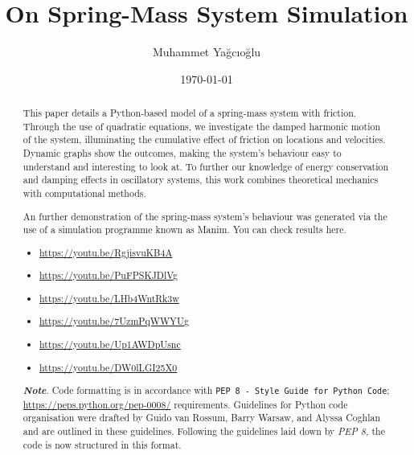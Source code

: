 \documentclass[12pt, a4paper, oneside]{report}
\title{On Spring-Mass System Simulation}
\author{Muhammet Yağcıoğlu}
\date{\today}
\begin{document}
\maketitle

\begin{abstract}
	This paper details a Python-based model of a spring-mass system with friction. Through the use of quadratic equations, we investigate the damped harmonic motion of the system, illuminating the cumulative effect of friction on locations and velocities. Dynamic graphs show the outcomes, making the system's behaviour easy to understand and interesting to look at. To further our knowledge of energy conservation and damping effects in oscillatory systems, this work combines theoretical mechanics with computational methods.

	\vfill
	An further demonstration of the spring-mass system's behaviour was generated via the use of a simulation programme known as Manim. You can check results here.

	\begin{itemize}
		\item \url{https://youtu.be/RgjisvuKB4A}
		\item \url{https://youtu.be/PuFPSKJDlVg}
		\item \url{https://youtu.be/LHb4WntRk3w}
		\item \url{https://youtu.be/7UzmPqWWYUg}
		\item \url{https://youtu.be/Up1AWDpUsnc}
		\item \url{https://youtu.be/DW0lLGI25X0}
	\end{itemize}

	\vfill
	\textbf{\textit{Note}}. Code formatting is in accordance with \texttt{PEP 8 - Style Guide for Python Code}; \url{https://peps.python.org/pep-0008/} requirements. Guidelines for Python code organisation were drafted by Guido van Rossum, Barry Warsaw, and Alyssa Coghlan and are outlined in these guidelines. Following the guidelines laid down by \textit{PEP 8,} the code is now structured in this format.
\end{abstract}

\tableofcontents


\lstlistoflistings
{}
\listofalgorithms
\listoffigures
\listoftables
\end{document}
